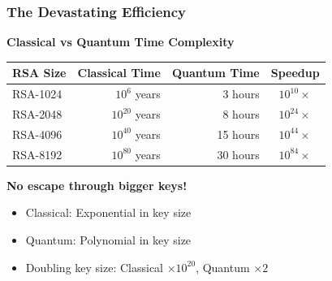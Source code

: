 \documentclass[aspectratio=169,10pt]{beamer}
\newcommand{\teaching}[1]{}
\newcommand{\slideheader}[1]{\frametitle{#1}}
\theoremstyle{plain}
\begin{document}
\begin{frame}
  \slideheader{The Devastating Efficiency}
  
  \begin{center}
    \textbf{\large Classical vs Quantum Time Complexity}
  \end{center}
  
  \vspace{0.3cm}
  
  \begin{table}
    \centering
    \begin{tabular}{|l|r|r|c|}
      \hline
      \textbf{RSA Size} & \textbf{Classical Time} & \textbf{Quantum Time} & \textbf{Speedup} \\
      \hline
      RSA-1024 & $10^6$ years & 3 hours & $10^{10}\times$ \\
      RSA-2048 & $10^{20}$ years & 8 hours & $10^{24}\times$ \\
      RSA-4096 & $10^{40}$ years & 15 hours & $10^{44}\times$ \\
      RSA-8192 & $10^{80}$ years & 30 hours & $10^{84}\times$ \\
      \hline
    \end{tabular}
  \end{table}
  
  \vspace{0.5cm}
  
  \begin{redBox}
    \textbf{No escape through bigger keys!}
    \begin{itemize}
      \item Classical: Exponential in key size
      \item Quantum: Polynomial in key size
      \item Doubling key size: Classical $\times 10^{20}$, Quantum $\times 2$
    \end{itemize}
  \end{redBox}
  
  \vspace{0.3cm}
  
  
  \teaching{Drive home the exponential vs polynomial gap}
\end{frame}
\end{document}
